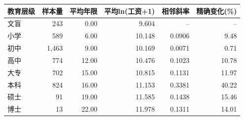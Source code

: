 \begin{tabular}{lrrrrr}
\toprule
教育层级 & 样本量 & 平均年限 & 平均ln(工资+1) & 相邻斜率 & 精确变化(\%) \\
\midrule
文盲 & 243 & 0.00 & 9.604 & -- & -- \\
小学 & 589 & 6.00 & 10.148 & 0.0906 & 9.48 \\
初中 & 1,463 & 9.00 & 10.169 & 0.0071 & 0.71 \\
高中 & 774 & 12.00 & 10.476 & 0.1023 & 10.78 \\
大专 & 702 & 15.00 & 10.815 & 0.1131 & 11.97 \\
本科 & 824 & 16.00 & 11.153 & 0.3381 & 40.22 \\
硕士 & 91 & 19.00 & 11.585 & 0.1438 & 15.46 \\
博士 & 13 & 22.00 & 11.978 & 0.1311 & 14.01 \\
\bottomrule
\end{tabular}

